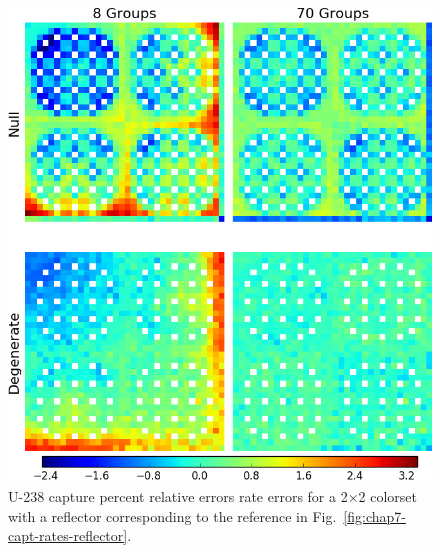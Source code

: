 \begin{figure}[h!]
\centering
\includegraphics[width=\linewidth]{figures/quantification/reflector/capt-err}
\vspace{2mm}
\caption[U-238 capture rate errors for a 2$\times$2 colorset with a reflector]{U-238 capture percent relative errors rate errors for a 2$\times$2 colorset with a reflector corresponding to the reference in Fig.~\ref{fig:chap7-capt-rates-reflector}.}
\label{fig:chap8-reflector-capt-err}
\end{figure}

\clearpage

